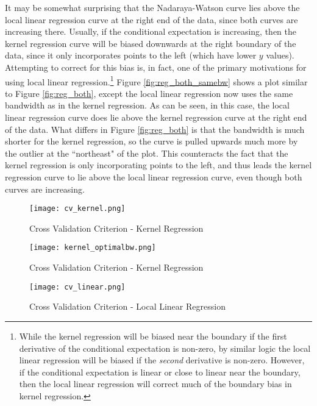 \documentclass[]{report}
\newcommand{\0}{\bv{0}}
\newcommand{\1}{\bv{1}}
\begin{document}
\begin{enumerate}[1.]
\begin{enumerate}
It may be somewhat surprising that the Nadaraya-Watson curve lies above the local linear regression curve at the right end of the data, since both curves are increasing there. Usually, if the conditional expectation is increasing, then the kernel regression curve will be biased downwards at the right boundary of the data, since it only incorporates points to the left (which have lower $y$ values). Attempting to correct for this bias is, in fact, one of the primary motivations for using local linear regression.\footnote{While the kernel regression will be biased near the boundary if the first derivative of the conditional expectation is non-zero, by similar logic the local linear regression will be biased if the \textit{second} derivative is non-zero. However, if the conditional expectation is linear or close to linear near the boundary, then the local linear regression will correct much of the boundary bias in kernel regression.} Figure \ref{fig:reg_both_samebw} shows a plot similar to Figure \ref{fig:reg_both}, except the local linear regression now uses the same bandwidth as in the kernel regression. As can be seen, in this case, the local linear regression curve does lie above the kernel regression curve at the right end of the data. What differs in Figure \ref{fig:reg_both} is that the bandwidth is much shorter for the kernel regression, so the curve is pulled upwards much more by the outlier at the ``northeast" of the plot. This counteracts the fact that the kernel regression is only incorporating points to the left, and thus leads the kernel regression curve to lie above the local linear regression curve, even though both curves are increasing.



\begin{figure}[hbtp]
	\begin{center}
		\caption{Cross Validation Criterion - Kernel Regression}
		\label{fig:cv_kernel}
		\texttt{[image: cv\_kernel.png]}
	\end{center}
\end{figure}


\begin{figure}[hbtp]
	\begin{center}
		\caption{Cross Validation Criterion - Kernel Regression}
		\label{fig:reg_kernel}
		\texttt{[image: kernel\_optimalbw.png]}
	\end{center}
\end{figure}



\begin{figure}[hbtp]
	\begin{center}
		\caption{Cross Validation Criterion - Local Linear Regression}
		\label{fig:cv_linear}
		\texttt{[image: cv\_linear.png]}
	\end{center}
\end{figure}



\end{enumerate}
\end{enumerate}
\end{document}
